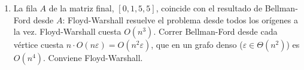 \begin{enumerate}[label=(\alph*)]
\begin{center}
    \bigskip
    \hspace{1cm}
  \end{center}
  La diagonal queda en cero, lo que confirma que no hay ciclos negativos.

  \item La fila $A$ de la matriz final, $[0, 1, 5, 5]$, coincide con el resultado de Bellman-Ford desde $A$: Floyd-Warshall resuelve el problema desde todos los orígenes a la vez. Floyd-Warshall cuesta $O(n^3)$. Correr Bellman-Ford desde cada vértice cuesta $n \cdot O(n\varepsilon) = O(n^2 \varepsilon)$, que en un grafo denso ($\varepsilon \in \Theta(n^2)$) es $O(n^4)$. Conviene Floyd-Warshall.
\end{enumerate}
